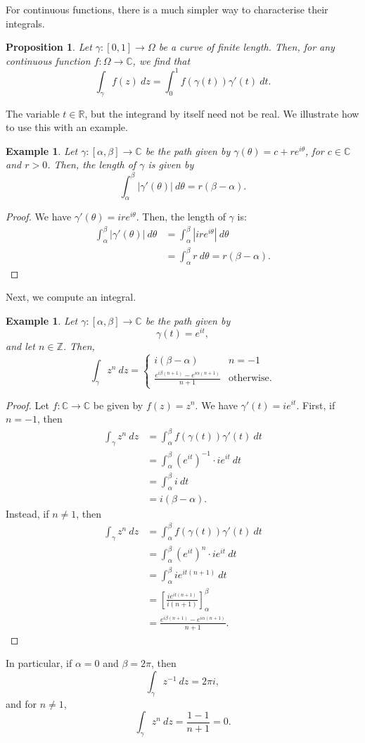 \documentclass[a4paper, openany]{memoir}
\theoremstyle{definition}
\theoremstyle{plain}
\newtheorem{proposition}[definition]{Proposition}
\newtheorem{example}[definition]{Example}
\begin{document}
For continuous functions, there is a much simpler way to characterise their integrals.
\begin{proposition}
Let $\gamma: [0, 1] \to \Omega$ be a curve of finite length. Then, for any continuous function $f: \Omega \to \mathbb{C}$, we find that
\[\int_\gamma f(z) \ dz = \int_0^1 f(\gamma(t)) \gamma'(t) \ dt.\]
\end{proposition}
\noindent The variable $t \in \mathbb{R}$, but the integrand by itself need not be real. We illustrate how to use this with an example.
\begin{example}
Let $\gamma: [\alpha, \beta] \to \mathbb{C}$ be the path given by $\gamma(\theta) = c + re^{i \theta}$, for $c \in \mathbb{C}$ and $r > 0$. Then, the length of $\gamma$ is given by
\[\int_\alpha^\beta |\gamma'(\theta)| \ d\theta = r(\beta - \alpha).\]
\end{example}
\begin{proof}
We have $\gamma'(\theta) = ire^{i \theta}$. Then, the length of $\gamma$ is:
\begin{align*}
    \int_\alpha^\beta |\gamma'(\theta)| \ d\theta &= \int_\alpha^\beta |ir e^{i \theta}| \ d\theta \\
    &= \int_\alpha^\beta r \ d\theta =  r(\beta - \alpha).
\end{align*}
\end{proof}
Next, we compute an integral.
\begin{example}
Let $\gamma: [\alpha, \beta] \to \mathbb{C}$ be the path given by
\[\gamma(t) = e^{it},\]
and let $n \in \mathbb{Z}$. Then,
\[\int_\gamma z^n \ dz = \begin{cases}
i(\beta - \alpha) & n = -1 \\
\frac{e^{i\beta(n+1)} - e^{i\alpha(n+1)}}{n+1} & \text{otherwise}.
\end{cases}\]
\end{example}
\begin{proof}
Let $f: \mathbb{C} \to \mathbb{C}$ be given by $f(z) = z^n$. We have $\gamma'(t) = ie^{it}$. First, if $n = -1$, then
\begin{align*}
    \int_\gamma z^n \ dz &= \int_\alpha^\beta f(\gamma(t)) \gamma'(t) \ dt \\
    &= \int_\alpha^\beta (e^{it})^{-1} \cdot ie^{it} \ dt \\
    &= \int_\alpha^\beta i \ dt \\
    &= i(\beta - \alpha).
\end{align*}
Instead, if $n \neq 1$, then
\begin{align*}
    \int_\gamma z^n \ dz &= \int_\alpha^\beta f(\gamma(t)) \gamma'(t) \ dt \\
    &= \int_\alpha^\beta (e^{it})^n \cdot ie^{it} \ dt \\
    &= \int_\alpha^\beta ie^{it(n+1)} \ dt \\
    &= \left[\frac{ie^{it(n+1)}}{i(n+1)}\right]_\alpha^\beta \\
    &= \frac{e^{i\beta(n+1)} - e^{i\alpha(n+1)}}{n+1}.
\end{align*}
\end{proof}
\noindent In particular, if $\alpha = 0$ and $\beta = 2\pi$, then
\[\int_\gamma z^{-1} \ dz = 2\pi i,\]
and for $n \neq 1$,
\[\int_\gamma z^n \ dz = \frac{1 - 1}{n+1} = 0.\]
\end{document}
